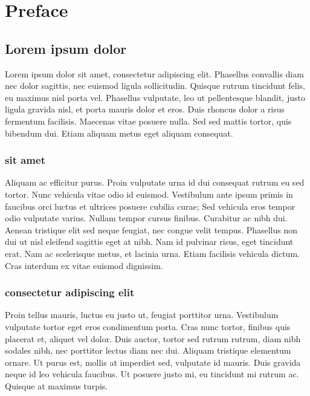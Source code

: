 \chapter*{Preface}

\section{Lorem ipsum dolor}

 Lorem ipsum dolor sit amet, consectetur adipiscing elit. Phasellus convallis diam nec dolor sagittis, nec euismod ligula sollicitudin. Quisque rutrum tincidunt felis, eu maximus nisl porta vel. Phasellus vulputate, leo ut pellentesque blandit, justo ligula gravida nisl, et porta mauris dolor et eros. Duis rhoncus dolor a risus fermentum facilisis. Maecenas vitae posuere nulla. Sed sed mattis tortor, quis bibendum dui. Etiam aliquam metus eget aliquam consequat.

\subsection{sit amet}

Aliquam ac efficitur purus. Proin vulputate urna id dui consequat rutrum eu sed tortor. Nunc vehicula vitae odio id euismod. Vestibulum ante ipsum primis in faucibus orci luctus et ultrices posuere cubilia curae; Sed vehicula eros tempor odio vulputate varius. Nullam tempor cursus finibus. Curabitur ac nibh dui. Aenean tristique elit sed neque feugiat, nec congue velit tempus. Phasellus non dui ut nisl eleifend sagittis eget at nibh. Nam id pulvinar risus, eget tincidunt erat. Nam ac scelerisque metus, et lacinia urna. Etiam facilisis vehicula dictum. Cras interdum ex vitae euismod dignissim.

\subsection{consectetur adipiscing elit}

Proin tellus mauris, luctus eu justo ut, feugiat porttitor urna. Vestibulum vulputate tortor eget eros condimentum porta. Cras nunc tortor, finibus quis placerat et, aliquet vel dolor. Duis auctor, tortor sed rutrum rutrum, diam nibh sodales nibh, nec porttitor lectus diam nec dui. Aliquam tristique elementum ornare. Ut purus est, mollis at imperdiet sed, vulputate id mauris. Duis gravida neque id leo vehicula faucibus. Ut posuere justo mi, eu tincidunt mi rutrum ac. Quisque at maximus turpis.
